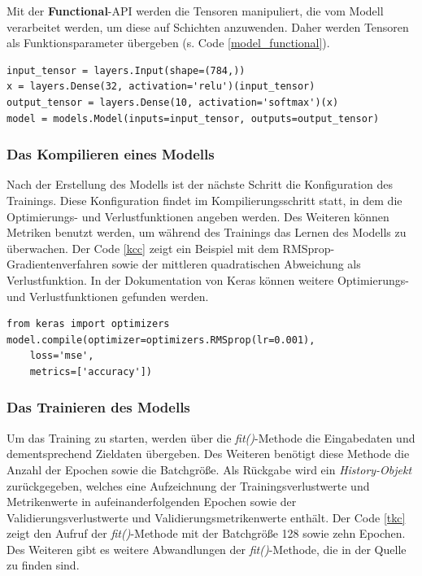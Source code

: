 Mit der \textbf{Functional}-API werden die Tensoren manipuliert, die vom Modell verarbeitet werden, um diese auf Schichten anzuwenden. Daher werden Tensoren als Funktionsparameter übergeben (s. Code \ref{model_functional}).

\begin{lstlisting}[caption={Ein anderer Ansatz zu der Erstellung eines Modells mittels der \textbf{Functional}-API\cite{francois}.}, label=model_functional]
input_tensor = layers.Input(shape=(784,))
x = layers.Dense(32, activation='relu')(input_tensor)
output_tensor = layers.Dense(10, activation='softmax')(x)
model = models.Model(inputs=input_tensor, outputs=output_tensor)
\end{lstlisting}

\subsubsection{Das Kompilieren eines Modells}
Nach der Erstellung des Modells ist der nächste Schritt die Konfiguration des Trainings\cite{francois}. Diese Konfiguration findet im Kompilierungsschritt statt, in dem die Optimierungs- und Verlustfunktionen angeben werden. Des Weiteren können Metriken benutzt werden, um während des Trainings das Lernen des Modells zu überwachen. Der Code \ref{kcc} zeigt ein Beispiel mit dem RMSprop-Gradientenverfahren sowie der mittleren quadratischen Abweichung als Verlustfunktion. In der Dokumentation von Keras können weitere Optimierungs- und Verlustfunktionen gefunden werden\cite{keras_doc}.


\begin{lstlisting}[caption={Die Kompilierung eines Modells\cite{francois}.}, label=kcc]
from keras import optimizers
model.compile(optimizer=optimizers.RMSprop(lr=0.001),
	loss='mse',
	metrics=['accuracy'])
\end{lstlisting}


\subsubsection{Das Trainieren des Modells}
Um das Training zu starten, werden über die \textit{fit()}-Methode die Eingabedaten und dementsprechend Zieldaten übergeben. Des Weiteren benötigt diese Methode die Anzahl der Epochen sowie die Batchgröße. Als Rückgabe wird ein \textit{History-Objekt} zurückgegeben, welches eine Aufzeichnung der Trainingsverlustwerte und Metrikenwerte in aufeinanderfolgenden Epochen sowie der Validierungsverlustwerte und Validierungsmetrikenwerte enthält\cite{francois}.
Der Code \ref{tkc} zeigt den Aufruf der \textit{fit()}-Methode mit der Batchgröße 128 sowie zehn Epochen. Des Weiteren gibt es weitere Abwandlungen der \textit{fit()}-Methode, die in der Quelle zu finden sind\cite{keras_doc}.


